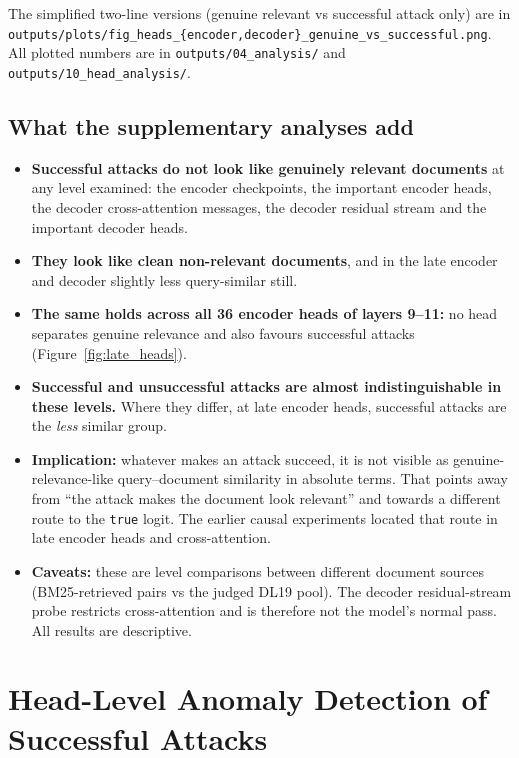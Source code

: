 \documentclass[11pt]{article}
\begin{document}
The simplified two-line versions (genuine relevant vs successful attack only) are in
\texttt{outputs/plots/fig\_heads\_\{encoder,decoder\}\_genuine\_vs\_successful.png}.
All plotted numbers are in \texttt{outputs/04\_analysis/} and
\texttt{outputs/10\_head\_analysis/}.

\subsection{What the supplementary analyses add}

\begin{itemize}[nosep]
  \item \textbf{Successful attacks do not look like genuinely relevant documents} at any
        level examined: the encoder checkpoints, the important encoder heads, the
        decoder cross-attention messages, the decoder residual stream and the
        important decoder heads.
  \item \textbf{They look like clean non-relevant documents}, and in the late encoder
        and decoder slightly less query-similar still.
  \item \textbf{The same holds across all 36 encoder heads of layers 9--11:} no head
        separates genuine relevance and also favours successful attacks
        (Figure~\ref{fig:late_heads}).
  \item \textbf{Successful and unsuccessful attacks are almost indistinguishable in
        these levels.} Where they differ, at late encoder heads, successful attacks are
        the \emph{less} similar group.
  \item \textbf{Implication:} whatever makes an attack succeed, it is not visible as
        genuine-relevance-like query--document similarity in absolute terms. That
        points away from ``the attack makes the document look relevant'' and towards a
        different route to the \texttt{true} logit. The earlier causal experiments
        located that route in late encoder heads and cross-attention.
  \item \textbf{Caveats:} these are level comparisons between different document
        sources (BM25-retrieved pairs vs the judged DL19 pool). The decoder
        residual-stream probe restricts cross-attention and is therefore not the
        model's normal pass. All results are descriptive.
\end{itemize}

\section{Head-Level Anomaly Detection of Successful Attacks}
\label{sec:anomaly}
\end{document}
